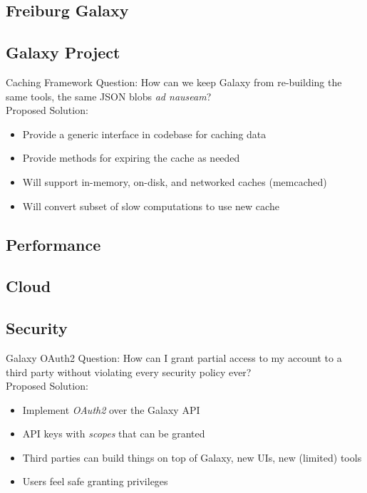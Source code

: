 \documentclass[12pt]{ufrslides}
\begin{document}
\subsection{Freiburg Galaxy}

\subsection{Galaxy Project}

	\begin{frame}{Caching Framework}
		Question: How can we keep Galaxy from re-building the same tools, the same JSON blobs \textit{ad nauseam}?\\[0.6cm]
		Proposed Solution:
		\begin{itemize}
			\item Provide a generic interface in codebase for caching data
			\item Provide methods for expiring the cache as needed
			\item Will support in-memory, on-disk, and networked caches (memcached)
			\item Will convert subset of slow computations to use new cache
		\end{itemize}
	\end{frame}

\subsection{Performance}

\subsection{Cloud}

\subsection{Security}

	\begin{frame}{Galaxy OAuth2}
		Question: How can I grant partial access to my account to a third party without violating every security policy ever? \\[0.6cm]
		Proposed Solution:
		\begin{itemize}
			\item Implement \emph{OAuth2} over the Galaxy API
			\item API keys with \emph{scopes} that can be granted
			\item Third parties can build things on top of Galaxy, new UIs, new (limited) tools
			\item Users feel safe granting privileges
		\end{itemize}
	\end{frame}
\end{document}

